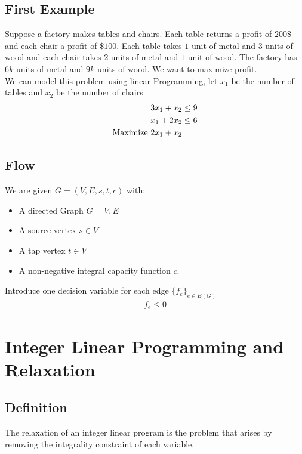 \documentclass[12pt]{cours}
\begin{document}
\subsection{First Example}
Suppose a factory makes tables and chairs. Each table returns a profit of $200\$$ and each chair a profit of $\$100$. Each table takes $1$ unit of metal and $3$ units of wood and each chair takes $2$ units of metal and $1$ unit of wood. The factory has $6k$ units of metal and $9k$ units of wood. We want to maximize profit.\\
We can model this problem using linear Programming, let $x_{1}$ be the number of tables and $x_{2}$ be the number of chairs 
\[
    \begin{aligned}
        3x_{1} + x_{2} &\leq 9\\
        x_{1} + 2x_{2} &\leq 6\\
        \textnormal{Maximize } 2x_{1} + x_{2}
    \end{aligned}    
\]

\subsection{Flow}
\begin{proposition}
    We are given $G = (V, E, s, t, c)$ with: 
    \begin{itemize}
        \item A directed Graph $G = V, E$
        \item A source vertex $s \in V$
        \item A tap vertex $t\in V$
        \item A non-negative integral capacity function $c$. 
    \end{itemize}
    Introduce one decision variable for each edge $\{f_{e}\}_{e \in E(G)}$
    \[
        \begin{aligned}
            f_{e} \leq 0
        \end{aligned}
    \]
\end{proposition}

\section{Integer Linear Programming and Relaxation}
\subsection{Definition}
\begin{definition}
    The relaxation of an integer linear program is the problem that arises by removing the integrality constraint of each variable.
\end{definition}
\end{document}
